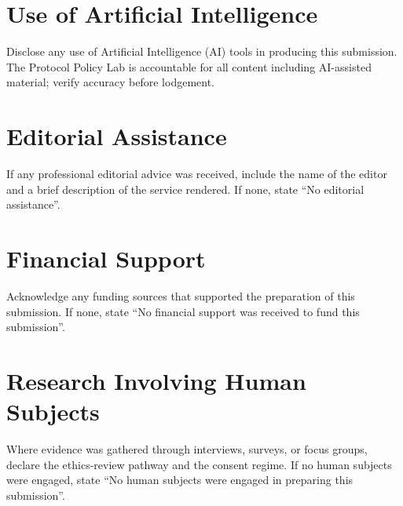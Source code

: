 \section{Use of Artificial Intelligence}

\begin{instructional}
Disclose any use of Artificial Intelligence (AI) tools in producing this submission. The Protocol Policy Lab is accountable for all content including AI-assisted material; verify accuracy before lodgement.
\end{instructional}


\section{Editorial Assistance}

\begin{instructional}
If any professional editorial advice was received, include the name of the editor and a brief description of the service rendered. If none, state ``No editorial assistance''.
\end{instructional}


\section{Financial Support}

\begin{instructional}
Acknowledge any funding sources that supported the preparation of this submission. If none, state ``No financial support was received to fund this submission''.
\end{instructional}


\section{Research Involving Human Subjects}

\begin{instructional}
Where evidence was gathered through interviews, surveys, or focus groups, declare the ethics-review pathway and the consent regime. If no human subjects were engaged, state ``No human subjects were engaged in preparing this submission''.
\end{instructional}


